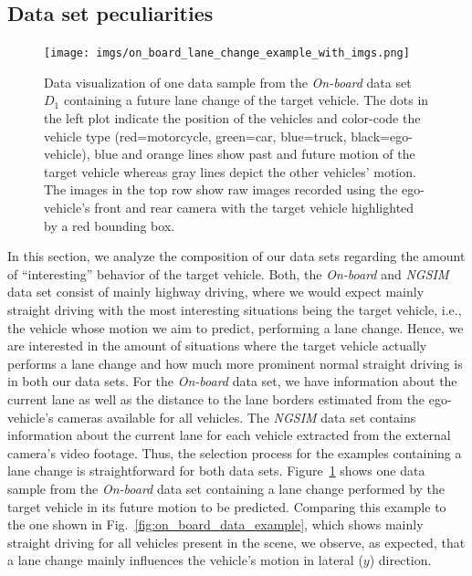 \subsection{Data set peculiarities}%
\label{subsec:data_set_peculiarities}

\begin{figure}[t]
    \centering
    \texttt{[image: imgs/on\_board\_lane\_change\_example\_with\_imgs.png]}
    \caption{Data visualization of one data sample from the \emph{On-board} data set $D_1$ containing a future lane change of the target vehicle.
        The dots in the left plot indicate the position of the vehicles and color-code the vehicle type (red=motorcycle, green=car, blue=truck, black=ego-vehicle), blue and orange lines show past and future motion of the target vehicle whereas gray lines depict the other vehicles' motion.
        The images in the top row show raw images recorded using the ego-vehicle's front and rear camera with the target vehicle highlighted by a red bounding box.}
    \label{fig:on_board_lane_change_example_with_imgs}
\end{figure}

In this section, we analyze the composition of our data sets regarding the amount of \enquote{interesting} behavior of the target vehicle.
Both, the \emph{On-board} and \emph{\ac{NGSIM}} data set consist of mainly highway driving, where we would expect mainly straight driving with the most interesting situations being the target vehicle, i.e., the vehicle whose motion we aim to predict, performing a lane change.
Hence, we are interested in the amount of situations where the target vehicle actually performs a lane change and how much more prominent normal straight driving is in both our data sets.
For the \emph{On-board} data set, we have information about the current lane as well as the distance to the lane borders estimated from the ego-vehicle's cameras available for all vehicles.
The \emph{\ac{NGSIM}} data set contains information about the current lane for each vehicle extracted from the external camera's video footage.
Thus, the selection process for the examples containing a lane change is straightforward for both data sets.
Figure~\ref{fig:on_board_lane_change_example_with_imgs} shows one data sample from the \emph{On-board} data set containing a lane change performed by the target vehicle in its future motion to be predicted.
Comparing this example to the one shown in Fig.~\ref{fig:on_board_data_example}, which shows mainly straight driving for all vehicles present in the scene, we observe, as expected, that a lane change mainly influences the vehicle's motion in lateral ($y$) direction.


